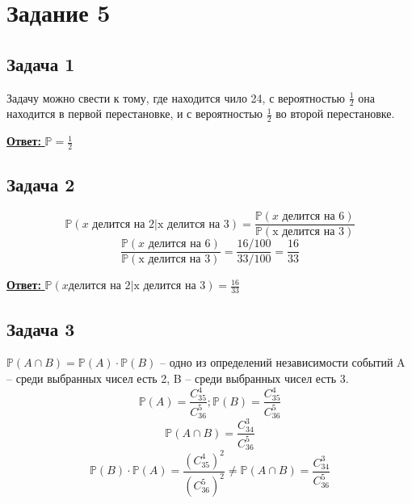 \documentclass[a4paper,14pt]{article} %
\begin{document}

\section{Задание 5}

\subsection{Задача 1}
Задачу можно свести к тому, где находится чило 24, с вероятностью $\frac{1}{2}$ она находится в первой
перестановке, и с вероятностью $\frac{1}{2}$ во второй перестановке.

\underline{\textbf{Ответ: }} $\mathds{P} = \frac{1}{2}$

\subsection{Задача 2}
\begin{equation*}
	\mathds{P}(x \text{ делится на 2}| \text{x делится на 3}) = \frac{\mathds{P}(x \text{ делится на 6})}{\mathds{P}(\text{x делится на 3})}	
\end{equation*}
\begin{equation*}
	\frac{\mathds{P}(x \text{ делится на 6})}{\mathds{P}(\text{x делится на 3})} = \frac{16/100}{33/100} = \frac{16}{33}
\end{equation*}

\underline{\textbf{Ответ: }} $\mathds{P}(x \text{делится на 2}| \text{x делится на 3}) = \frac{16}{33}$

\subsection{Задача 3}
$\mathds{P}(A \cap B) = \mathds{P}(A) \cdot \mathds{P}(B)$ -- одно из определений независимости событий
\newline
A -- среди выбранных чисел есть 2, B -- среди выбранных чисел есть 3.
\newline
\begin{equation*}
	\mathds{P}(A) = \frac{C_{35}^4}{C_{36}^5}; \mathds{P}(B) = \frac{C_{35}^4}{C_{36}^5}	
\end{equation*}
\begin{equation*}
	\mathds{P}(A \cap B) = \frac{C_{34}^3}{C_{36}^5}	
\end{equation*}
\begin{equation*}
	\mathds{P}(B) \cdot \mathds{P}(A) = \frac{(C_{35}^4)^2}{(C_{36}^5)^2} \not = \mathds{P}(A \cap B) = \frac{C_{34}^3}{C_{36}^5}	
\end{equation*}
\end{document}

